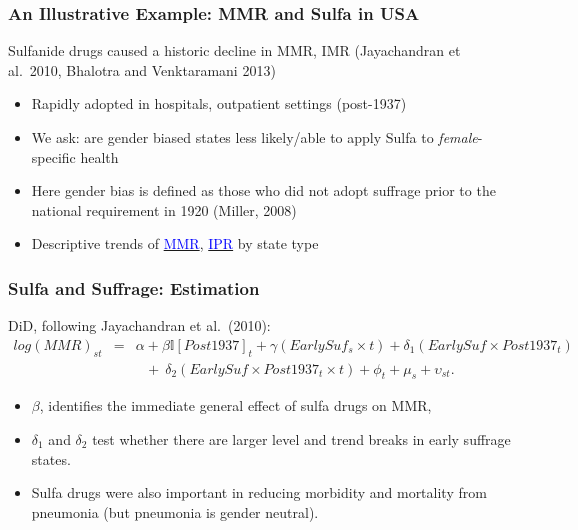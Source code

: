 \documentclass[legno]{beamer}
\begin{document}
\begin{frame}[label=USA]
\frametitle{An Illustrative Example: MMR and Sulfa in USA}
Sulfanide drugs caused a historic decline in MMR, IMR (Jayachandran et al.\ 2010, Bhalotra and Venktaramani 2013)
\vspace{6mm}
\begin{itemize}
\item Rapidly adopted in hospitals, outpatient settings (post-1937)
\item We ask: are gender biased states less likely/able to apply Sulfa to \emph{female}-specific health
\item Here gender bias is defined as those who did not adopt suffrage prior to the national requirement in 1920 (Miller, 2008)
\item Descriptive trends of {\footnotesize \hyperlink{Mtrend}{\textcolor{blue}{MMR}}}, {\footnotesize \hyperlink{Ptrend}{\textcolor{blue}{IPR}}} by state type
\end{itemize}
\end{frame}

\begin{frame}
\frametitle{Sulfa and Suffrage: Estimation}

DiD, following Jayachandran et al.\ (2010):
\scriptsize
\begin{eqnarray}
log(MMR)_{st} & = &\alpha + \beta \mathbb{I}[Post1937]_t + \gamma(EarlySuf_{s}\times t)
                + \delta_1 (EarlySuf\times Post1937_t) \nonumber \\
              & &\ \ \ + \ \delta_2 (EarlySuf\times Post1937_t\times t) + \phi_t + \mu_s
                + \upsilon_{st}. \nonumber
\end{eqnarray}
\normalsize
\begin{itemize}
\item $\beta$, identifies the immediate general effect of sulfa drugs on MMR, 
\item $\delta_1$ and $\delta_2$ test whether there are larger level and trend breaks in early suffrage states.
\item Sulfa drugs were also important in reducing morbidity and mortality from  pneumonia (but pneumonia is gender neutral).
\end{itemize}
\end{frame}

\begin{frame}[plain]

\end{frame}
\end{document}
